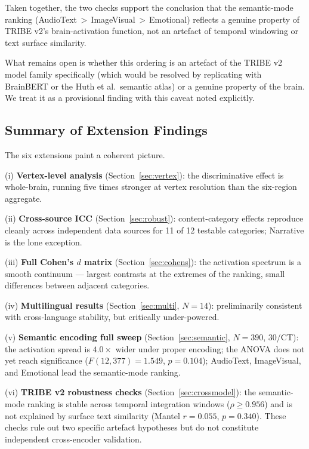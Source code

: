 \documentclass[11pt,letterpaper]{article}
\begin{document}
Taken together, the two checks support the conclusion that the semantic-mode ranking (AudioText\,$>$\,ImageVisual\,$>$\,Emotional) reflects a genuine property of TRIBE v2's brain-activation function, not an artefact of temporal windowing or text surface similarity.

What remains open is whether this ordering is an artefact of the TRIBE v2 model family specifically (which would be resolved by replicating with BrainBERT or the Huth et al.\ semantic atlas) or a genuine property of the brain. We treat it as a provisional finding with this caveat noted explicitly.

\subsection{Summary of Extension Findings}

The six extensions paint a coherent picture.

(i) \textbf{Vertex-level analysis} (Section~\ref{sec:vertex}): the discriminative effect is whole-brain, running five times stronger at vertex resolution than the six-region aggregate.

(ii) \textbf{Cross-source ICC} (Section~\ref{sec:robust}): content-category effects reproduce cleanly across independent data sources for 11 of 12 testable categories; Narrative is the lone exception.

(iii) \textbf{Full Cohen's $d$ matrix} (Section~\ref{sec:cohens}): the activation spectrum is a smooth continuum --- largest contrasts at the extremes of the ranking, small differences between adjacent categories.

(iv) \textbf{Multilingual results} (Section~\ref{sec:multi}, $N=14$): preliminarily consistent with cross-language stability, but critically under-powered.

(v) \textbf{Semantic encoding full sweep} (Section~\ref{sec:semantic}, $N=390$, 30/CT): the activation spread is $4.0\times$ wider under proper encoding; the ANOVA does not yet reach significance ($F(12,377)=1.549$, $p=0.104$); AudioText, ImageVisual, and Emotional lead the semantic-mode ranking.

(vi) \textbf{TRIBE v2 robustness checks} (Section~\ref{sec:crossmodel}): the semantic-mode ranking is stable across temporal integration windows ($\rho \geq 0.956$) and is not explained by surface text similarity (Mantel $r = 0.055$, $p = 0.340$). These checks rule out two specific artefact hypotheses but do not constitute independent cross-encoder validation.
\end{document}
